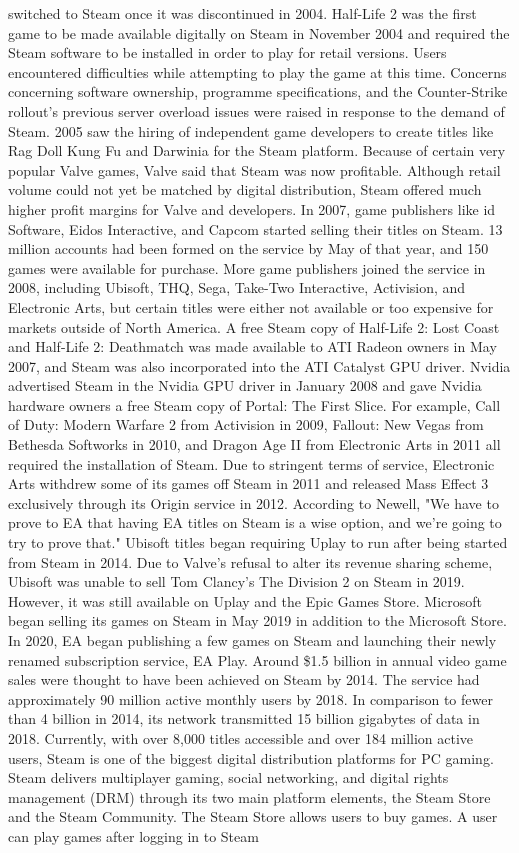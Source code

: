 \documentclass[runningheads]{llncs}
\begin{document}
switched to Steam once it was discontinued in 2004. Half-Life 2 was the first game to be made available digitally on Steam in November 2004 and required the Steam software to be installed in order to play for retail versions. Users encountered difficulties while attempting to play the game at this time. Concerns concerning software ownership, programme specifications, and the Counter-Strike rollout's previous server overload issues were raised in response to the demand of Steam. 2005 saw the hiring of independent game developers to create titles like Rag Doll Kung Fu and Darwinia for the Steam platform. Because of certain very popular Valve games, Valve said that Steam was now profitable. Although retail volume could not yet be matched by digital distribution, Steam offered much higher profit margins for Valve and developers. In 2007, game publishers like id Software, Eidos Interactive, and Capcom started selling their titles on Steam. 13 million accounts had been formed on the service by May of that year, and 150 games were available for purchase. More game publishers joined the service in 2008, including Ubisoft, THQ, Sega, Take-Two Interactive, Activision, and Electronic Arts, but certain titles were either not available or too expensive for markets outside of North America. A free Steam copy of Half-Life 2: Lost Coast and Half-Life 2: Deathmatch was made available to ATI Radeon owners in May 2007, and Steam was also incorporated into the ATI Catalyst GPU driver. Nvidia advertised Steam in the Nvidia GPU driver in January 2008 and gave Nvidia hardware owners a free Steam copy of Portal: The First Slice. For example, Call of Duty: Modern Warfare 2 from Activision in 2009, Fallout: New Vegas from Bethesda Softworks in 2010, and Dragon Age II from Electronic Arts in 2011 all required the installation of Steam. Due to stringent terms of service, Electronic Arts withdrew some of its games off Steam in 2011 and released Mass Effect 3 exclusively through its Origin service in 2012. According to Newell, "We have to prove to EA that having EA titles on Steam is a wise option, and we're going to try to prove that." Ubisoft titles began requiring Uplay to run after being started from Steam in 2014. Due to Valve's refusal to alter its revenue sharing scheme, Ubisoft was unable to sell Tom Clancy's The Division 2 on Steam in 2019. However, it was still available on Uplay and the Epic Games Store. Microsoft began selling its games on Steam in May 2019 in addition to the Microsoft Store. In 2020, EA began publishing a few games on Steam and launching their newly renamed subscription service, EA Play. Around \$1.5 billion in annual video game sales were thought to have been achieved on Steam by 2014. The service had approximately 90 million active monthly users by 2018. In comparison to fewer than 4 billion in 2014, its network transmitted 15 billion gigabytes of data in 2018. Currently, with over 8,000 titles accessible and over 184 million active users, Steam is one of the biggest digital distribution platforms for PC gaming. Steam delivers multiplayer gaming, social networking, and digital rights management (DRM) through its two main platform elements, the Steam Store and the Steam Community. The Steam Store allows users to buy games. A user can play games after logging in to Steam 
\end{document}
